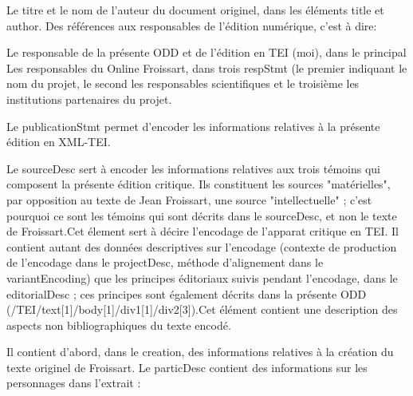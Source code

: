 \documentclass[12pt, a4paper]{article}
\begin{document}
                           Le titre et le nom de l'auteur du document originel, dans les éléments title et author.
                           Des références aux responsables de l'édition numérique, c'est à dire:
                              
                                 Le responsable de la présente ODD et de l'édition en TEI (moi), dans le principal
                                 Les responsables du Online Froissart, dans trois respStmt (le premier indiquant le nom du projet, le second les responsables
                                    scientifiques et le troisième les institutions partenaires du projet.
                              
                           
                           Le publicationStmt permet d'encoder les informations relatives à la présente édition en XML-TEI.
                        
                     Le sourceDesc sert à encoder les informations relatives aux trois témoins qui composent la présente édition critique. Ils constituent les
                        sources "matérielles", par opposition au texte de Jean Froissart, une source "intellectuelle" ; c'est pourquoi ce sont les témoins qui sont décrits
                        dans le sourceDesc, et non le texte de Froissart.Cet élement sert à décire l'encodage de l'apparat critique en TEI. Il contient autant des données descriptives sur l'encodage (contexte de
                        production de l'encodage dans le projectDesc, méthode d'alignement dans le variantEncoding) que les principes éditoriaux 
                        suivis pendant l'encodage, dans le editorialDesc ; ces principes sont également décrits dans la présente ODD
                        (/TEI/text[1]/body[1]/div1[1]/div2[3]).Cet élément contient une description des aspects non bibliographiques du texte encodé.
                        
                           Il contient d'abord, dans le creation, des informations
                              relatives à la création du texte originel de Froissart. 
                           Le particDesc contient des informations sur les personnages dans l'extrait :
                              
\end{document}
